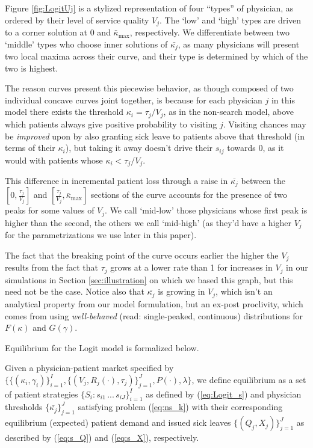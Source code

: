 \documentclass[../main.tex]{subfiles}
\begin{document}
Figure \ref{fig:LogitUj} is a stylized representation of four ``types'' of physician, as ordered by their level of service quality $V_j$. The `low' and `high' types are driven to a corner solution at 0 and $\bar{\kappa}_{\max}$, respectively. We differentiate between two `middle' types who choose inner solutions of $\bar{\kappa_j}$, as many physicians will present two local maxima across their curve, and their type is determined by which of the two is highest.

The reason curves present this piecewise behavior, as though composed of two individual concave curves joint together, is because for each physician $j$ in this model there exists the threshold $\kappa_i = \tau_j/V_j$, as in the non-search model, above which patients always give positive probability to visiting $j$. Visiting chances may be \textit{improved} upon by also granting sick leave to patients above that threshold (in terms of their $\kappa_i$), but taking it away doesn't drive their $s_{ij}$ towards 0, as it would with patients whose $\kappa_i < \tau_j/V_j$.

This difference in incremental patient loss through a raise in $\bar{\kappa_j}$ between the $[0,\frac{\tau_j}{V_j}]$ and $[\frac{\tau_j}{V_j},\bar{\kappa}_{\max}]$ sections of the curve accounts for the presence of two peaks for some values of $V_j$. We call `mid-low' those physicians whose first peak is higher than the second, the others we call `mid-high' (as they'd have a higher $V_j$ for the parametrizations we use later in this paper).

The fact that the breaking point of the curve occurs earlier the higher the $V_j$ results from the fact that $\tau_j$ grows at a lower rate than 1 for increases in $V_j$ in our simulations in Section \ref{sec:illustration} on which we based this graph, but this need not be the case. Notice also that $\bar{\kappa_j}$ is growing in $V_j$, which isn't an analytical property from our model formulation, but an ex-post proclivity, which comes from using \textit{well-behaved} (read: single-peaked, continuous) distributions for $F(\kappa)$ and $G(\gamma)$.

Equilibrium for the Logit model is formalized below.


\begin{equilibrium}
    \label{Logit_eq}
Given a physician-patient market specified by $\{\{(\kappa_i,\gamma_i)\}_{i =1}^{I},\{(V_j, R_j(\cdot), \tau_j)\}_{j =1}^{J}, P(\cdot), \lambda \}$, we define equilibrium as a set of patient strategies $\{S_i: s_{i1} \, ... \, s_{iJ}\}_{i =1}^{I}$ as defined by (\ref{eq:Logit_s}) and physician thresholds $\{\bar{\kappa_j}\}_{j =1}^{J}$ satisfying problem (\ref{eq:ns_k}) with their corresponding equilibrium (expected) patient demand and issued sick leaves $\{(Q_j,X_j)\}_{j =1}^{J}$ as described by (\ref{eq:s_Q}) and (\ref{eq:s_X}), respectively.
\end{equilibrium}
\end{document}
